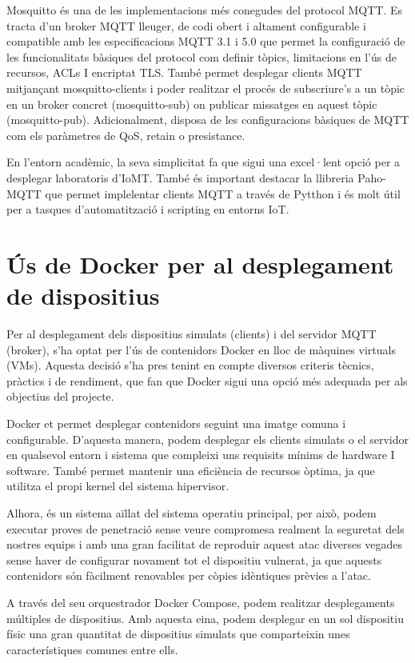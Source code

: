   \label{sec:mosquitto}
  Mosquitto és una de les implementacions més conegudes del protocol MQTT. Es tracta d’un broker MQTT lleuger, de codi obert i altament configurable i compatible amb les especificacions MQTT 3.1 i 5.0 que permet la configuració de les funcionalitats bàsiques del protocol com definir tòpics, limitacions en l'ús de recursos, ACLs I encriptat TLS. També permet desplegar clients MQTT mitjançant mosquitto-clients i poder realitzar el procés de subscriure’s a un tòpic en un broker concret (mosquitto-sub) on publicar missatges en aquest tòpic (mosquitto-pub). Adicionalment, disposa de les configuracions bàsiques de MQTT com els paràmetres de QoS, retain o presistance. \cite{Mosquittoexp}

  En l’entorn acadèmic, la seva simplicitat fa que sigui una excel·lent opció per a desplegar laboratoris d’IoMT.
  \label{sec:Paho-MQTT}
  També és important destacar la llibreria Paho-MQTT que permet implelentar clients MQTT a través de Pytthon i és molt útil per a tasques d'automatització i scripting en entorns IoT. 


\section{Ús de Docker per al desplegament de dispositius}
\label{sec:Docker}
  Per al desplegament dels dispositius simulats (clients) i del servidor MQTT (broker), s’ha optat per l’ús de contenidors Docker en lloc de màquines virtuals (VMs). Aquesta decisió s’ha pres tenint en compte diversos criteris tècnics, pràctics i de rendiment, que fan que Docker sigui una opció més adequada per als objectius del projecte.

  Docker et permet desplegar contenidors seguint una imatge comuna i configurable. D’aquesta manera, podem desplegar els clients simulats o el servidor en qualsevol entorn i sistema que compleixi uns requisits mínims de hardware I software. També permet mantenir una eficiència de recursos òptima, ja que utilitza el propi kernel del sistema hipervisor.

  Alhora, és un sistema aïllat del sistema operatiu principal, per això, podem executar proves de penetració sense veure compromesa realment la seguretat dels nostres equips i amb una gran facilitat de reproduir aquest atac diverses vegades sense haver de configurar novament tot el dispositiu vulnerat, ja que aquests contenidors són fàcilment renovables per còpies idèntiques prèvies a l'atac.
  
  A través del seu orquestrador Docker Compose, podem realitzar desplegaments múltiples de dispositius. Amb aquesta eina, podem desplegar en un sol dispositiu físic una gran quantitat de dispositius simulats que comparteixin unes característiques comunes entre ells.

